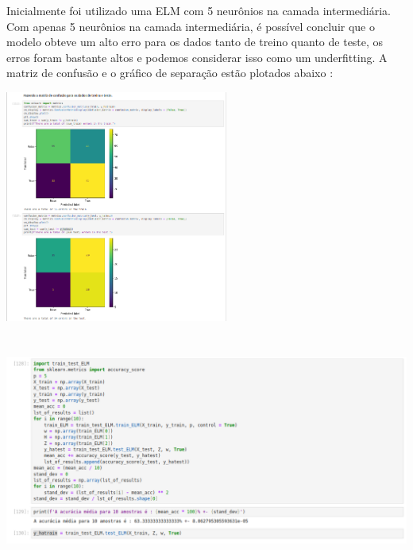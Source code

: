 \documentclass{article}
\begin{document}
\begin{center}
\begin{center}
\end{center}

\vspace{5pt}
Inicialmente foi utilizado uma ELM com 5 neurônios na camada intermediária. Com apenas 5 neurônios na camada intermediária, é possível concluir que o modelo obteve um alto erro para os dados tanto de treino quanto de teste, os erros foram bastante altos e podemos considerar isso como um underfitting. A matriz de confusão e o gráfico de separação estão plotados abaixo :

\begin{center}

\includegraphics[height=3in]{Ex6/Hearth_Disease/conf_matrix_health_5.png}
\vspace{10pt}

\end{center}

\begin{center}

\includegraphics[height=3in]{Ex6/Hearth_Disease/acc_5.png}
\vspace{10pt}


\end{center}
\end{center}
\end{document}
